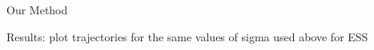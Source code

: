 \documentclass[14pt]{beamer}
\begin{document}
\begin{frame}{Our Method}
    \begin{outline}
        \1 Results: plot trajectories for the same values of sigma used above for ESS


    \end{outline}
\end{frame}






\end{document}
